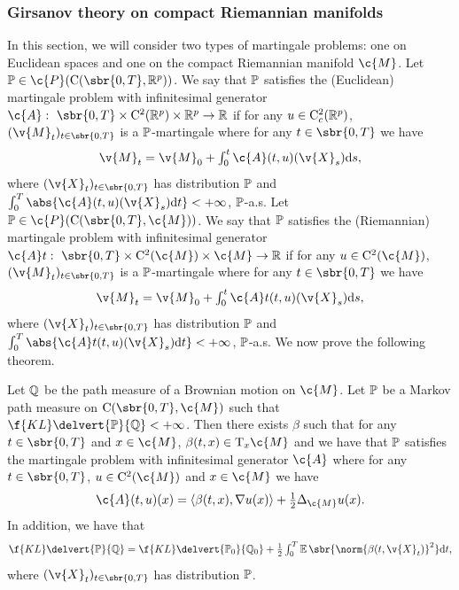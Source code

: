 \subsubsection{Girsanov theory on compact Riemannian manifolds}
\label{sec:girs-theory-comp}

In this section, we will consider two types of martingale problems: one on Euclidean spaces and one on the compact Riemannian manifold $\c{M}$.
Let $\bb{P} \in \c{P}(\mathrm{C}(\sbr{0,T}, \R^p))$.
We say that $\bb{P}$ satisfies the (Euclidean) martingale problem with infinitesimal generator $\c{A}: \ \sbr{0,T} \times \mathrm{C}^2(\R^p) \times \R^p \to \R$ if for any $u \in \mathrm{C}_c^2(\mathbb{R}^p)$, $(\v{M}_t)_{t \in \sbr{0,T}}$ is a $\bb{P}$-martingale where for any $t \in \sbr{0,T}$ we have \begin{equation} \textstyle{ \v{M}_t = \v{M}_0 + \int_0^t \c{A}(t, u)(\v{X}_s) \mathrm{d} s , } \end{equation} where $(\v{X}_t)_{t \in \sbr{0,T}}$ has distribution $\bb{P}$ and $\int_0^T \abs{\c{A}(t, u)(\v{X}_s) \mathrm{d} t} <+\infty$, $\bb{P}$-a.s.
Let $\bb{P} \in \c{P}(\mathrm{C}(\sbr{0,T}, \c{M}))$.
We say that $\bb{P}$ satisfies the (Riemannian) martingale problem with infinitesimal generator $\c{A}t: \ \sbr{0,T} \times \mathrm{C}^2(\c{M}) \times \c{M} \to \R$ if for any $u \in \mathrm{C}^2(\c{M})$, $(\v{M}_t)_{t \in \sbr{0,T}}$ is a $\bb{P}$-martingale where for any $t \in \sbr{0,T}$ we have \begin{equation} \textstyle{ \v{M}_t = \v{M}_0 + \int_0^t \c{A}t(t, u)(\v{X}_s) \mathrm{d} s , } \end{equation} where $(\v{X}_t)_{t \in \sbr{0,T}}$ has distribution $\bb{P}$ and $\int_0^T \abs{\c{A}t(t, u)(\v{X}_s) \mathrm{d} t} <+\infty$, $\bb{P}$-a.s.
We now prove the following theorem.

\begin{proposition}
	\label{prop:girsanov_manifold}
	Let $\bb{Q}$ be the path measure of a Brownian motion on $\c{M}$.
	Let $\bb{P}$ be a Markov path measure on $\mathrm{C}(\sbr{0,T}, \c{M})$ such that $\f{KL}\delvert{\bb{P}}{\bb{Q}} < +\infty$.
	Then there exists $\beta$ such that for any $t \in \sbr{0,T}$ and $x \in \c{M}$, $\beta(t,x) \in \mathrm{T}_x \c{M}$ and we have that $\bb{P}$ satisfies the martingale problem with infinitesimal generator $\c{A}$ where for any $t \in \sbr{0,T}$, $u \in \mathrm{C}^2(\c{M})$ and $x \in \c{M}$ we have \begin{equation} \c{A}(t,u)(x) = \langle \beta(t,x), \nabla u(x) \rangle + \tfrac{1}{2} \Delta_\c{M} u(x) .
	\end{equation}
	In addition, we have that \begin{equation} \textstyle{\f{KL}\delvert{\bb{P}}{\bb{Q}} = \f{KL}\delvert{\bb{P}_0}{\bb{Q}_0} + \tfrac{1}{2} \int_0^T \E\sbr{\norm{\beta(t, \v{X}_t)}^2} \mathrm{d} t ,} \end{equation} where $(\v{X}_t)_{t \in \sbr{0,T}}$ has distribution $\bb{P}$.
\end{proposition}

